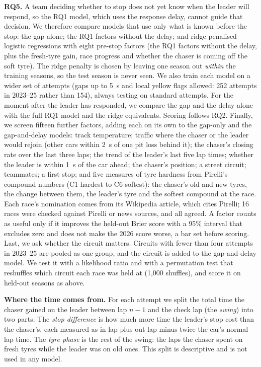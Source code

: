 \documentclass[12pt]{article}
\begin{document}
\textbf{RQ5.} A team deciding whether to stop does not yet know when the leader will respond, so the RQ1 model, which uses the response delay, cannot guide that decision. We therefore compare models that use only what is known before the stop: the gap alone; the RQ1 factors without the delay; and ridge-penalised logistic regressions \citep{hoerl1970ridge} with eight pre-stop factors (the RQ1 factors without the delay, plus the fresh-tyre gain, race progress and whether the chaser is coming off the soft tyre). The ridge penalty is chosen by leaving one season out \emph{within} the training seasons, so the test season is never seen. We also train each model on a wider set of attempts (gaps up to 5~s and local yellow flags allowed: 252 attempts in 2023--25 rather than 154), always testing on standard attempts. For the moment after the leader has responded, we compare the gap and the delay alone with the full RQ1 model and the ridge equivalents. Scoring follows RQ2. Finally, we screen fifteen further factors, adding each on its own to the gap-only and the gap-and-delay models: track temperature; traffic where the chaser or the leader would rejoin (other cars within 2~s of one pit loss behind it); the chaser's closing rate over the last three laps; the trend of the leader's last five lap times; whether the leader is within 1~s of the car ahead; the chaser's position; a street circuit; teammates; a first stop; and five measures of tyre hardness from Pirelli's compound numbers (C1 hardest to C6 softest): the chaser's old and new tyres, the change between them, the leader's tyre and the softest compound at the race. Each race's nomination comes from its Wikipedia article, which cites Pirelli; 16 races were checked against Pirelli or news sources, and all agreed. A factor counts as useful only if it improves the held-out Brier score with a 95\% interval that excludes zero and does not make the 2026 score worse, a bar set before scoring. Last, we ask whether the circuit matters. Circuits with fewer than four attempts in 2023--25 are pooled as one group, and the circuit is added to the gap-and-delay model. We test it with a likelihood ratio and with a permutation test that reshuffles which circuit each race was held at (1,000 shuffles), and score it on held-out seasons as above.

\textbf{Where the time comes from.} For each attempt we split the total time the chaser gained on the leader between lap $n-1$ and the check lap (the \emph{swing}) into two parts. The \emph{stop difference} is how much more time the leader's stop cost than the chaser's, each measured as in-lap plus out-lap minus twice the car's normal lap time. The \emph{tyre phase} is the rest of the swing: the laps the chaser spent on fresh tyres while the leader was on old ones. This split is descriptive and is not used in any model.
\end{document}
